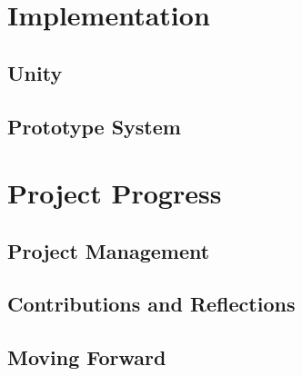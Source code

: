 \documentclass{sig-alternate-05-2015}
\begin{document}
\section{Implementation}
\subsection{Unity}
\subsection{Prototype System}

\section{Project Progress}
\subsection{Project Management}
\subsection{Contributions and Reflections}
\subsection{Moving Forward}

\newpage
{}
\end{document}
